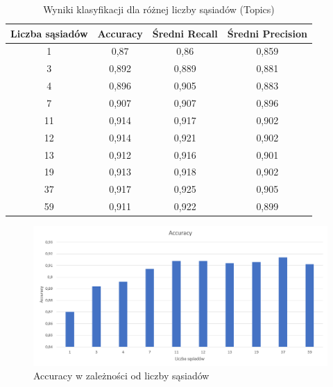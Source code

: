 \documentclass{classrep}
\begin{document}
{\begin{table}[h]
\begin{center}
\caption{Wyniki klasyfikacji dla różnej liczby sąsiadów (Topics)}
\begin{tabular}{|c|c|c|c|}
\hline
\textbf{Liczba sąsiadów} & \textbf{Accuracy} & \textbf{Średni Recall} & \textbf{Średni Precision} \\ \hline
1                        & 0,87              & 0,86                   & 0,859                     \\ \hline
3                        & 0,892             & 0,889                  & 0,881                     \\ \hline
4                        & 0,896             & 0,905                  & 0,883                     \\ \hline
7                        & 0,907             & 0,907                  & 0,896                     \\ \hline
11                       & 0,914             & 0,917                  & 0,902                     \\ \hline
12                       & 0,914             & 0,921                  & 0,902                     \\ \hline
13                       & 0,912             & 0,916                  & 0,901                     \\ \hline
19                       & 0,913             & 0,918                  & 0,902                     \\ \hline
37                       & 0,917             & 0,925                  & 0,905                     \\ \hline
59                       & 0,911             & 0,922                  & 0,899                     \\ \hline
\end{tabular}
\end{center}
\end{table}

\begin{figure}[H]
\caption{Accuracy w zależności od liczby sąsiadów}
\centering
\includegraphics[width=1\textwidth]{i7}
\end{figure}

}
\end{document}
